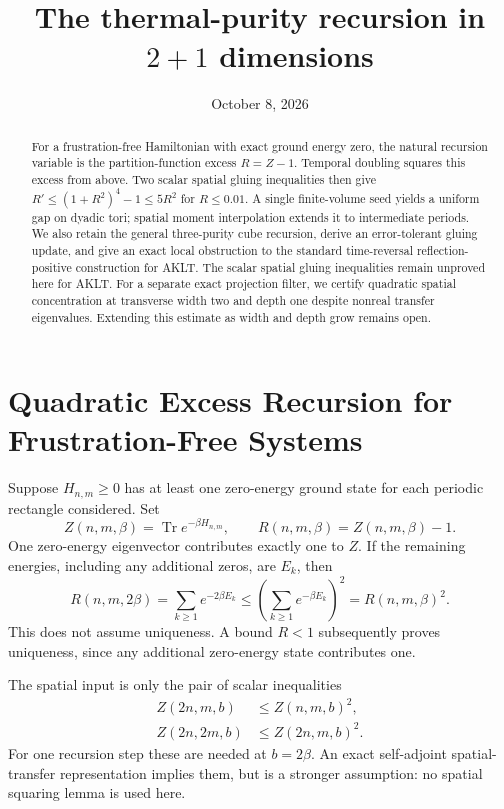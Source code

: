 \documentclass[11pt]{article}
\title{The thermal-purity recursion in \(2+1\) dimensions}
\author{}
\date{October 8, 2026}
\newcommand{\Tr}{\operatorname{Tr}}
\begin{document}
\maketitle

\begin{abstract}
	For a frustration-free Hamiltonian with exact ground energy zero, the
	natural recursion variable is the partition-function excess \(R=Z-1\).
	Temporal doubling squares this excess from above. Two scalar spatial
	gluing inequalities then give
	\(R'\le(1+R^2)^4-1\le5R^2\) for \(R\le0.01\).
	A single finite-volume seed yields a uniform gap on dyadic tori;
	spatial moment interpolation extends it to intermediate periods.
	We also retain the general three-purity cube recursion, derive an
	error-tolerant gluing update, and give an exact local obstruction to
	the standard time-reversal reflection-positive construction for AKLT.
	The scalar spatial gluing inequalities remain unproved here for AKLT.
	For a separate exact projection filter, we certify quadratic spatial
	concentration at transverse width two and depth one despite nonreal
	transfer eigenvalues. Extending this estimate as width and depth grow
	remains open.
\end{abstract}

\section{Quadratic Excess Recursion for Frustration-Free Systems}

Suppose \(H_{n,m}\ge0\) has at least one zero-energy ground state for
each periodic rectangle considered. Set
\[
	Z(n,m,\beta)=\Tr e^{-\beta H_{n,m}},\qquad
	R(n,m,\beta)=Z(n,m,\beta)-1.
\]
One zero-energy eigenvector contributes exactly one to \(Z\). If the
remaining energies, including any additional zeros, are \(E_k\), then
\begin{equation}
	R(n,m,2\beta)=\sum_{k\ge1}e^{-2\beta E_k}
	\le\left(\sum_{k\ge1}e^{-\beta E_k}\right)^2
	=R(n,m,\beta)^2.
	\label{eq:ff-time}
\end{equation}
This does not assume uniqueness. A bound \(R<1\) subsequently proves
uniqueness, since any additional zero-energy state contributes one.

The spatial input is only the pair of scalar inequalities
\begin{align}
	Z(2n,m,b)  & \le Z(n,m,b)^2,\label{eq:ff-x}  \\
	Z(2n,2m,b) & \le Z(2n,m,b)^2.\label{eq:ff-y}
\end{align}
For one recursion step these are needed at \(b=2\beta\).
An exact self-adjoint spatial-transfer representation implies them,
but is a stronger assumption: no spatial squaring lemma is used here.
\end{document}
